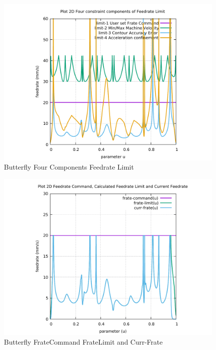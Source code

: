 \begin{figure}
	\caption     {Butterfly Four Components Feedrate Limit}
	\label{10-img-Butterfly-Four-Components-Feedrate-Limit.pdf}
\includegraphics[width=1.00\textwidth]{Chap4/appendix/app-Butterfly/plots/10-img-Butterfly-Four-Components-Feedrate-Limit.pdf}
\end{figure}

\clearpage
\pagebreak

\begin{figure}
	\caption     {Butterfly FrateCommand FrateLimit and Curr-Frate}
	\label{11-img-Butterfly-FrateCommand-FrateLimit-and-Curr-Frate.pdf}
	\includegraphics[width=1.00\textwidth]{Chap4/appendix/app-Butterfly/plots/11-img-Butterfly-FrateCommand-FrateLimit-and-Curr-Frate.pdf}
\end{figure}

